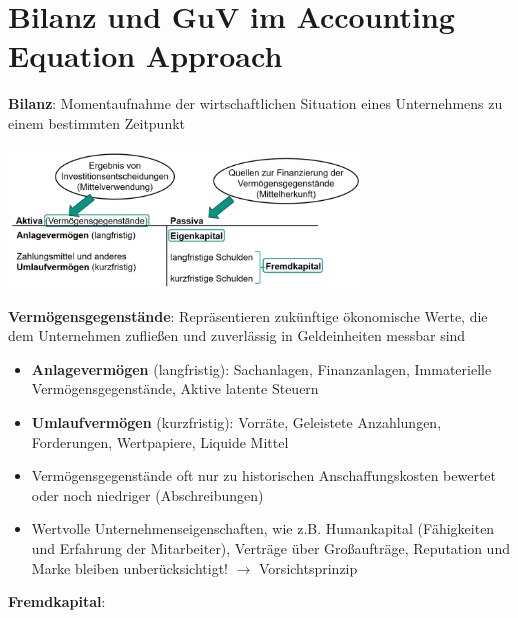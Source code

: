 \section{Bilanz und GuV im Accounting Equation Approach}

\textbf{Bilanz}: Momentaufnahme der wirtschaftlichen Situation eines Unternehmens zu einem bestimmten
Zeitpunkt
\begin{center}
	\includegraphics[width=0.7\textwidth]{images/bilanz.png}
\end{center}

\textbf{Vermögensgegenstände}: Repräsentieren zukünftige ökonomische Werte, die dem Unternehmen zufließen und zuverlässig in Geldeinheiten messbar sind
\begin{itemize}
	\item \textbf{Anlagevermögen} (langfristig): Sachanlagen, Finanzanlagen, Immaterielle Vermögensgegenstände, Aktive latente Steuern
	\item \textbf{Umlaufvermögen} (kurzfristig): Vorräte, Geleistete Anzahlungen, Forderungen, Wertpapiere, Liquide Mittel
	\item Vermögensgegenstände oft nur zu historischen Anschaffungskosten bewertet oder noch niedriger (Abschreibungen)
	\item Wertvolle Unternehmenseigenschaften, wie z.B. Humankapital (Fähigkeiten und Erfahrung der Mitarbeiter), Verträge über Großaufträge, Reputation und Marke bleiben unberücksichtigt!
	$\rightarrow$ Vorsichtsprinzip
\end{itemize}

\textbf{Fremdkapital}: 
